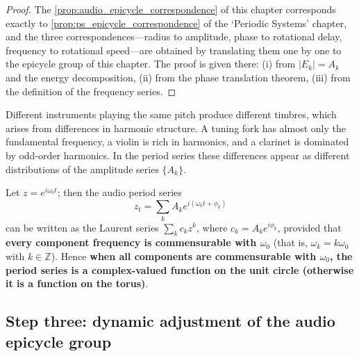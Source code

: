 \begin{proof}
The \cref{prop:audio_epicycle_correspondence} of this chapter corresponds exactly to \cref{prop:ps_epicycle_correspondence} of the `Periodic Systems' chapter,
and the three correspondences---radius to amplitude, phase to rotational delay, frequency to rotational speed---are obtained by translating them one by one to the epicycle group of this chapter.
The proof is given there: (i) from $|E_k|=A_k$ and the energy decomposition, (ii) from the phase translation theorem, (iii) from the definition of the frequency series.
\end{proof}

\begin{example}\label{ex:audio_timbre_series}
Different instruments playing the same pitch produce different timbres, which arises from differences in harmonic structure. A tuning fork has almost only the fundamental frequency, a violin is rich in harmonics, and a clarinet is dominated by odd-order harmonics. In the period series these differences appear as different distributions of the amplitude series $\{A_k\}$.
\end{example}

\begin{remark}\label{rem:audio_series_complex}
Let $z=e^{i\omega_0t}$; then the audio period series
\[
z_t=\sum_k A_k e^{i(\omega_k t+\phi_k)}
\]
can be written as the Laurent series $\sum_k c_k z^k$, where $c_k=A_k e^{i\phi_k}$, provided that \textbf{every component frequency is commensurable with $\omega_0$} (that is, $\omega_k=k\omega_0$ with $k\in\mathbb Z$). Hence \textbf{when all components are commensurable with $\omega_0$, the period series is a complex-valued function on the unit circle (otherwise it is a function on the torus)}.
\end{remark}

\subsection{Step three: dynamic adjustment of the audio epicycle group}


